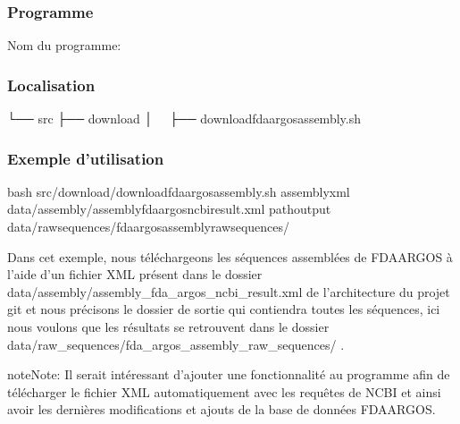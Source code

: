 \documentclass[letterpaper,10pt,french]{sphinxmanual}
\begin{document}
\subsubsection{Programme}
\label{\detokenize{tutorial:id1}}
Nom du programme:

\begin{sphinxVerbatim}[commandchars=\\\{\}]
\end{sphinxVerbatim}


\subsubsection{Localisation}
\label{\detokenize{tutorial:id2}}
\begin{sphinxVerbatim}[commandchars=\\\{\}]
└── src
 ├── download
 │   ├── download\PYGZus{}fda\PYGZus{}argos\PYGZus{}assembly.sh
\end{sphinxVerbatim}


\subsubsection{Exemple d’utilisation}
\label{\detokenize{tutorial:id3}}
\begin{sphinxVerbatim}[commandchars=\\\{\}]
bash src/download/download\PYGZus{}fda\PYGZus{}argos\PYGZus{}assembly.sh 
                 \PYGZhy{}assembly\PYGZus{}xml data/assembly/assembly\PYGZus{}fda\PYGZus{}argos\PYGZus{}ncbi\PYGZus{}result.xml 
                 \PYGZhy{}path\PYGZus{}output data/raw\PYGZus{}sequences/fda\PYGZus{}argos\PYGZus{}assembly\PYGZus{}raw\PYGZus{}sequences/
\end{sphinxVerbatim}

Dans cet exemple, nous téléchargeons les séquences assemblées de FDA\sphinxhyphen{}ARGOS à l’aide d’un fichier XML présent dans le dossier data/assembly/assembly\_fda\_argos\_ncbi\_result.xml de l’architecture du projet git et nous précisons le dossier de sortie qui contiendra toutes les séquences, ici nous voulons que les résultats se retrouvent dans le dossier data/raw\_sequences/fda\_argos\_assembly\_raw\_sequences/ .

\begin{sphinxadmonition}{note}{Note:}
Il serait intéressant d’ajouter une fonctionnalité au programme afin de télécharger le fichier XML automatiquement avec les requêtes de NCBI et ainsi avoir les dernières modifications et ajouts de la base de données FDA\sphinxhyphen{}ARGOS.
\end{sphinxadmonition}
\end{document}
